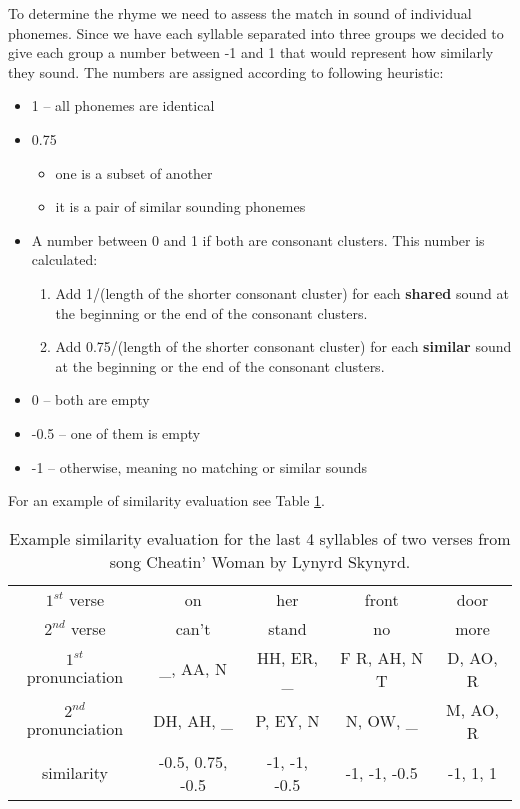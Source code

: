 To determine the rhyme we need to assess the match in sound of individual phonemes. Since we have each syllable separated into three groups we decided to give each group a number between -1 and 1 that would represent how similarly they sound. The numbers are assigned according to following heuristic:
\begin{itemize}
	\item 1 -- all phonemes are identical
	\item 0.75
	\begin{itemize}
		\item one is a subset of another
		\item it is a pair of similar sounding phonemes
	\end{itemize}
	\item A number between 0 and 1 if both are consonant clusters. This number is calculated:
	\begin{enumerate}
		\item Add 1/(length of the shorter consonant cluster) for each \textbf{shared} sound at the beginning or the end of the consonant clusters.
		\item Add 0.75/(length of the shorter consonant cluster) for each \textbf{similar} sound at the beginning or the end of the consonant clusters.
	\end{enumerate}
	\item 0 -- both are empty
	\item -0.5 -- one of them is empty
	\item -1 -- otherwise, meaning no matching or similar sounds
	
\end{itemize}

For an example of similarity evaluation see Table \ref{similarity_eval_table}.

\begin{table}[h!]
	\centering
	\begin{tabular}{c | c c c c} 
		$1^{st}$ verse & on & her & front & door \\ [0.5ex] 
		$2^{nd}$ verse & can't & stand & no & more \\ 
		\hline
		$1^{st}$ pronunciation & \_, AA, N & HH, ER, \_ & F R, AH, N T & D, AO, R \\
		$2^{nd}$ pronunciation & DH, AH, \_ & P, EY, N & N, OW, \_ & M, AO, R \\
		\hline
		similarity & -0.5, 0.75, -0.5 & -1, -1, -0.5 & -1, -1, -0.5 & -1, 1, 1 \\
	\end{tabular}
	\caption{Example similarity evaluation for the last 4 syllables of two verses from song Cheatin' Woman by Lynyrd Skynyrd.}
	\label{similarity_eval_table}
\end{table}

